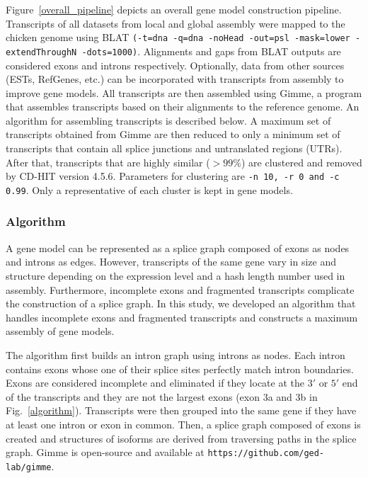 \documentclass[10pt]{article}
\begin{document}
Figure~\ref{overall_pipeline} depicts an overall gene model construction pipeline.
Transcripts of all datasets from local and global assembly were mapped to the chicken genome using
BLAT\cite{Kent:2002tv} \texttt{(-t=dna -q=dna -noHead -out=psl -mask=lower -extendThroughN -dots=1000)}.
Alignments and gaps from BLAT outputs are considered exons and introns respectively.
Optionally, data from other sources (ESTs, RefGenes, etc.) can be incorporated with transcripts from assembly to improve gene models.
All transcripts are then assembled using Gimme, a program that assembles transcripts based on their alignments to the reference genome.
An algorithm for assembling transcripts is described below.
A maximum set of transcripts obtained from Gimme are then reduced to only a minimum set of transcripts that contain
all splice junctions and untranslated regions (UTRs).
After that, transcripts that are highly similar ($>99\%$) are clustered and removed by CD-HIT version 4.5.6\cite{Li:2006hr}.
Parameters for clustering are \texttt{-n 10, -r 0 and -c 0.99}.
Only a representative of each cluster is kept in gene models.

\subsubsection*{Algorithm}

A gene model can be represented as a splice graph composed of exons as nodes and introns as edges.
However, transcripts of the same gene vary in size and structure depending on the expression level
and a hash length number used in assembly.
Furthermore, incomplete exons and fragmented transcripts complicate the construction of a splice graph.
In this study, we developed an algorithm that handles incomplete exons and fragmented transcripts
and constructs a maximum assembly of gene models.

The algorithm first builds an intron graph using introns as nodes.
Each intron contains exons whose one of their splice sites perfectly match intron boundaries.
Exons are considered incomplete and eliminated if they locate at the $3'$ or $5'$ end of the transcripts and
they are not the largest exons (exon 3a and 3b in Fig.~\ref{algorithm}).
Transcripts were then grouped into the same gene if they have at least one intron or exon in common.
Then, a splice graph composed of exons is created and structures of isoforms are derived from traversing
paths in the splice graph.
Gimme is open-source and available at \texttt{https://github.com/ged-lab/gimme}.
\end{document}
